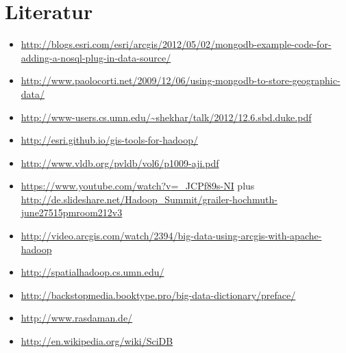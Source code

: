 \documentclass[
a4paper,     %
12pt         %
]{scrartcl}  %
\begin{document}
\section{Literatur}
\begin{itemize}
\item \url{http://blogs.esri.com/esri/arcgis/2012/05/02/mongodb-example-code-for-adding-a-nosql-plug-in-data-source/}
\item \url{http://www.paolocorti.net/2009/12/06/using-mongodb-to-store-geographic-data/}
\item \url{http://www-users.cs.umn.edu/~shekhar/talk/2012/12.6.sbd.duke.pdf}
\item \url{http://esri.github.io/gis-tools-for-hadoop/}
\item \url{http://www.vldb.org/pvldb/vol6/p1009-aji.pdf}
\item \url{https://www.youtube.com/watch?v=_JCPf89s-NI} plus \url{http://de.slideshare.net/Hadoop_Summit/grailer-hochmuth-june27515pmroom212v3}
\item \url{http://video.arcgis.com/watch/2394/big-data-using-arcgis-with-apache-hadoop}
\item \url{http://spatialhadoop.cs.umn.edu/}
\item \url{http://backstopmedia.booktype.pro/big-data-dictionary/preface/}
\item \url{http://www.rasdaman.de/}
\item \url{http://en.wikipedia.org/wiki/SciDB}

\end{itemize}



% 

% 
\end{document}
